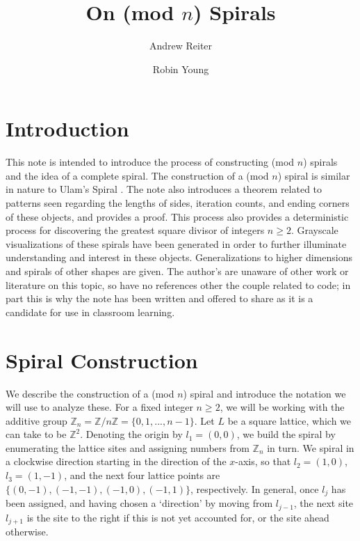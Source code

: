 \documentclass[11pt,reqno]{amsart}
\title{On (mod $n$) Spirals}
\author{Andrew Reiter}
\author{Robin Young}
\theoremstyle{mydef}
\def\ZZ{\mathbb{Z}}
\begin{document}
\maketitle
\section{Introduction}

This note is intended to introduce the process of constructing (mod $n$) spirals and the idea of a complete spiral.  The construction of a (mod $n$) spiral is similar in nature to Ulam's Spiral \cite{Ulam}. The note also introduces a theorem related to patterns seen regarding the lengths of sides, iteration counts, and ending corners of these objects, and provides a proof. This process also provides a deterministic process for discovering the greatest square divisor of integers $n \ge 2$. Grayscale visualizations of these spirals have been generated in order to  further illuminate understanding and interest in these objects. Generalizations to higher dimensions and spirals of other shapes are given. The author's are unaware of other work or literature on this topic, so have no references other the couple related to code; in part this is why the note has been written and offered to share as it is a candidate for use in classroom learning.



\section{Spiral Construction}

We describe the construction of a (mod $n$) spiral and introduce the
notation we will use to analyze these.  For a fixed integer $n \ge 2$,
we will be working with the additive group
$\ZZ_n=\mathbb{Z}/n\mathbb{Z} = \{ 0, 1, ..., n-1 \}$.  Let $L$
be a square lattice, which we can take to be $\ZZ^2$.  Denoting
the origin by $l_1 = (0,0)$, we build the spiral by enumerating the
lattice sites and assigning numbers from $\mathbb{Z}_n$ in turn.  We
spiral in a clockwise direction starting in the direction of the
$x$-axis, so that $l_2 = (1,0)$, $l_3 = (1,-1)$, and the next four
lattice points are $\{(0, -1),(-1, -1),(-1, 0),(-1, 1)\}$,
respectively.  In general, once $l_j$ has been assigned, and having
chosen a `direction' by moving from $l_{j-1}$, the next site $l_{j+1}$
is the site to the right if this is not yet accounted for, or the site
ahead otherwise.
\end{document}
